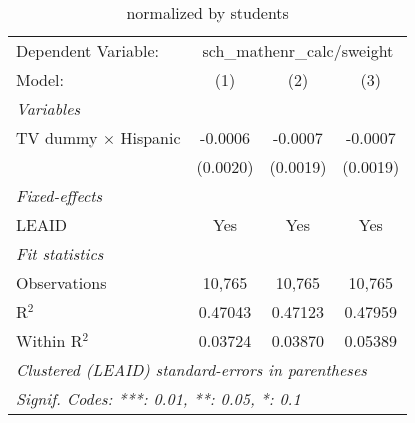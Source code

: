\begin{table}[htbp]
\centering
\caption{ normalized by students}
\begin{tabular}{lccc}
\tabularnewline\midrule\midrule
Dependent Variable:&\multicolumn{3}{c}{sch\_mathenr\_calc/sweight}\\
Model:&(1) & (2) & (3)\\
\midrule \emph{Variables}&   &   &  \\
TV dummy $\times$ Hispanic & -0.0006 & -0.0007 & -0.0007\\
  &(0.0020) & (0.0019) & (0.0019)\\
\midrule \emph{Fixed-effects}&   &   &  \\
LEAID & Yes & Yes & Yes\\
\midrule \emph{Fit statistics}&  & & \\
Observations & 10,765&10,765&10,765\\
R$^2$ & 0.47043&0.47123&0.47959\\
Within R$^2$ & 0.03724&0.03870&0.05389\\
\midrule\midrule\multicolumn{4}{l}{\emph{Clustered (LEAID) standard-errors in parentheses}}\\
\multicolumn{4}{l}{\emph{Signif. Codes: ***: 0.01, **: 0.05, *: 0.1}}\\
\end{tabular}
\end{table}

